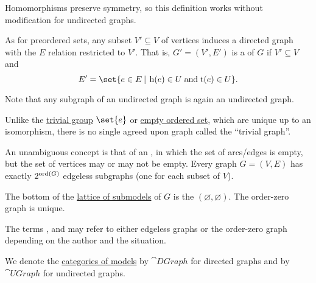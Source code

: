 \begin{definition}
\begin{thmenum}[resume=def:graph]
    Homomorphisms preserve symmetry, so this definition works without modification for undirected graphs.

     As for preordered sets, any subset \( V' \subseteq V \) of vertices induces a directed graph with the \( E \) relation restricted to \( V' \). That is, \( G' = (V', E') \) is a  of \( G \) if \( V' \subseteq V \) and
    \begin{equation*}
      E' = \set{ e \in E \given \head(e) \in U \T{and} \tail(e) \in U }.
    \end{equation*}

    Note that any subgraph of an undirected graph is again an undirected graph.

     Unlike the \hyperref[def:group/trivial]{trivial group} \( \set{ e } \) or \hyperref[def:partially_ordered_set/trivial]{empty ordered set}, which are unique up to an isomorphism, there is no single agreed upon graph called the \enquote{trivial graph}.

    An unambiguous concept is that of an , in which the set of arcs/edges is empty, but the set of vertices may or may not be empty. Every graph \( G = (V, E) \) has exactly \( 2^{\operatorname{ord}(G)} \) edgeless subgraphs (one for each subset of \( V \)).

    The bottom of the \hyperref[thm:substructures_form_complete_lattice]{lattice of submodels} of \( G \) is the  \( (\varnothing, \varnothing) \). The order-zero graph is unique.

    The terms ,  and  may refer to either edgeless graphs or the order-zero graph depending on the author and the situation.

     We denote the \hyperref[def:category_of_first_order_models]{categories of models} by \( \cat{DGraph} \) for directed graphs and by \( \cat{UGraph} \) for undirected graphs.
  \end{thmenum}
\end{definition}


